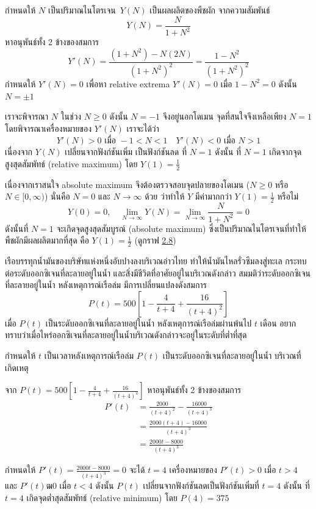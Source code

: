 \documentclass[
]{book}
\begin{document}
กำหนดให้ \(N\) เป็นปริมาณไนโตรเจน~\(Y(N)\) เป็นผลผลิตของพืชผัก จากความสัมพันธ์
\[Y(N)= \frac{N}{1+N^2}\] หาอนุพันธ์ทั้ง 2 ข้างของสมการ
\[Y'(N)= \frac{(1+N^2)-N(2N)}{(1+N^2)^2}= \frac{1-N^2}{(1+N^2)^2}\]
กำหนดให้ \(Y'(N)=0\) เพื่อหา relative extrema \(Y'(N)=0\) เมื่อ \(1-N^2=0\)
ดังนั้น \(N= \pm 1\)

เราจะพิจารณา \(N\) ในช่วง \(N \ge 0\) ดังนั้น \(N=-1\) จึงอยู่นอกโดเมน
จุดที่สนใจจึงเหลือเพียง \(N=1\) โดยพิจารณาเครื่องหมายของ \(Y'(N)\) เราจะได้ว่า
\[Y'(N) > 0 \text{ เมื่อ }  -1< N <1  \quad  Y'(N) < 0 \text{ เมื่อ } N > 1\]
เนื่องจาก \(Y(N)\) เปลี่ยนจากฟังก์ชันเพิ่ม เป็นฟังก์ชันลด ที่ \(N=1\) ดังนั้น ที่ \(N=1\)
เกิดจากจุดสูงสุดสัมพัทธ์ (relative maximum) โดย \(Y(1)= \frac{1}{2}\)

เนื่องจากเราสนใจ absolute maximum จึงต้องตรวจสอบจุดปลายของโดเมน (\(N \ge 0\)
หรือ \(N \in [0,\infty)\)) นั่นคือ \(N=0\) และ \(N \rightarrow \infty\) ด้วย
ว่าทำให้ \(Y\) มีค่ามากกว่า \(Y(1)= \frac{1}{2}\) หรือไม่
\[Y(0)=0,   \quad  \lim_{N \rightarrow \infty} Y(N) =\lim_{N \rightarrow \infty} \frac{N}{1+N^2} = 0\]
ดังนั้นที่ \(N=1\) จะเกิดจุดสูงสุดสัมบูรณ์ (absolute maximum)
ซึ่งเป็นปริมาณไนโตรเจนที่ทำให้พืชผักมีผลผลิตมากที่สุด คือ \(Y(1)= \frac{1}{2}\) (ดูกราฟ
\hyperref[fig-nitrogen]{2.8})

เรือบรรทุกน้ำมันของบริษัทแห่งหนึ่งอับปางลงบริเวณอ่าวไทย ทำให้น้ำมันไหลรั่วซึมลงสู่ทะเล
กระทบต่อระดับออกซิเจนที่ละลายอยู่ในน้ำ และสิ่งมีชีวิตที่อาศัยอยู่ในบริเวณดังกล่าว
สมมติว่าระดับออกซิเจนที่ละลายอยู่ในน้ำ หลังเหตุการณ์เรือล่ม มีการเปลี่ยนแปลงดังสมการ
\[P(t)=500[1- \frac{4}{t+4} + \frac{16}{(t+4)^2}]\] เมื่อ \(P(t)\)
เป็นระดับออกซิเจนที่ละลายอยู่ในน้ำ หลังเหตุการณ์เรือล่มผ่านพ้นไป \(t\) เดือน
อยากทราบว่าเมื่อไหร่ออกซิเจนที่ละลายอยู่ในน้ำบริเวณดังกล่าวจะอยู่ในระดับที่ต่ำที่สุด

กำหนดให้ \(t\) เป็นเวลาหลังเหตุการณ์เรือล่ม \(P(t)\) เป็นระดับออกซิเจนที่ละลายอยู่ในน้ำ
บริเวณที่เกิดเหตุ

จาก \(P(t)=500[1- \frac{4}{t+4} + \frac{16}{(t+4)^2}]\) หาอนุพันธ์ทั้ง 2
ข้างของสมการ \begin{equation}   \begin{aligned}
    P'(t) &= \frac{2000}{(t+4)^2} - \frac{16000}{(t+4)^3} \\
          &=\frac{2000(t+4)-16000}{(t+4)^3} \\
          &=\frac{2000t-8000}{(t+4)^3}
  \end{aligned} \end{equation}

กำหนดให้ \(\displaystyle P'(t)= \frac{2000t-8000}{(t+4)^3}=0\) จะได้
\(t=4\) เครื่องหมายของ \(P'(t) > 0\) เมื่อ \(t > 4\) และ \(P'(t) ฒ 0\) เมื่อ
\(t < 4\) ดังนั้น \(P(t)\) เปลี่ยนจากฟังก์ชันลดเป็นฟังก์ชันเพิ่มที่ \(t=4\) ดังนั้น ที่
\(t=4\) เกิดจุดต่ำสุดสัมพัทธ์ (relative minimum) โดย \(P(4)=375\)
\end{document}
